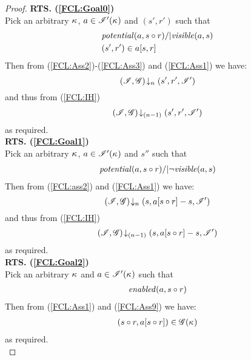 \begin{lemma}[]
\begin{proof}
%
\noindent\textbf{RTS. (\ref{FCL:Goal0})}\\
Pick an arbitrary $\kappa_{}$, $a \in \mathscr{I}'(\kappa_{})$ and $(s', r')$ such that 
\begin{align}
	& \mathit{potential}(a, s \circ r) /| \mathit{visible}(a, s) \label{FCL:Ass2}\\
	& (s', r') \in a[s, r] \label{FCL:Ass3}
\end{align}
%
Then from (\ref{FCL:Ass2})-(\ref{FCL:Ass3}) and (\ref{FCL:Ass1}) we have:
%
\begin{equation}
	\left(\mathscr{I}, \mathscr{G}\right) \!\downarrow_{n} \left(s', r', \mathscr{I}'\right) \nonumber
\end{equation}
%
and thus from (\ref{FCL:IH})
%
\begin{align*}
	\left(\mathscr{I}, \mathscr{G}\right) \!\downarrow_{(n-1)} \left(s', r', \mathscr{I}'\right) 
\end{align*}
% 
as required.\\
%
%
%

\noindent\textbf{RTS. (\ref{FCL:Goal1})}\\
Pick an arbitrary $\kappa_{}$, $a \in \mathscr{I}'(\kappa_{})$ and $s''$ such that 
\begin{align}
	\mathit{potential}(a, s \circ r) /| \neg\mathit{visible}(a, s) \label{FCL:ass2}
\end{align}
%
Then from (\ref{FCL:ass2}) and (\ref{FCL:Ass1}) we have:
%
\begin{equation}
	\left(\mathscr{I}, \mathscr{G}\right) \!\downarrow_{n} \left(s, a[s \circ r]-s, \mathscr{I}'\right) \nonumber
\end{equation}
%
and thus from (\ref{FCL:IH})
%
\begin{align*}
	\left(\mathscr{I}, \mathscr{G}\right) \!\downarrow_{(n-1)} \left(s, a[s \circ r]-s, \mathscr{I}'\right) 
\end{align*}
% 
as required.\\
%
%
%

\noindent\textbf{RTS. (\ref{FCL:Goal2})}\\
Pick an arbitrary $\kappa_{}$ and $a \in \mathscr{I}'(\kappa_{})$ such that 
\begin{align}
	\mathit{enabled}(a, s \circ r) \label{FCL:Ass9}
\end{align}
%
Then from (\ref{FCL:Ass1}) and (\ref{FCL:Ass9}) we have:
%
\begin{align}
	(s \circ r, a[s \circ r]) \in \mathscr{G}(\kappa_{}) \nonumber
\end{align}
% 
as required.\\
%
%
%


\end{proof}
\end{lemma}
